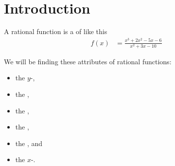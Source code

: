 \section{Introduction}

A rational function is a  of  like this 
    \begin{align*}
        f(x) &=  \frac{x^3 + 2x^2 - 5x - 6}{x^2 + 3x - 10}
    \end{align*}

\begin{tcolorbox}[center,width=4.5in,colback=white,]
    We will be finding these attributes of rational functions:
    \begin{itemize}[nosep]
        \item the $y$-,
        \item the 
            ,
        \item the ,
        \item the ,
        \item the  , and
        \item the $x$-.
    \end{itemize}
\end{tcolorbox}

